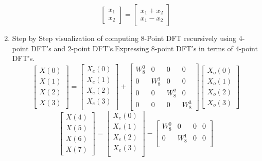 \documentclass[journal,12pt,twocolumn]{IEEEtran}
\renewcommand\thesection{\arabic{section}}
\begin{document}
\begin{enumerate}[label=\thesection.\arabic*.,ref=\thesection.\theenumi]
\begin{equation}
\begin{bmatrix}
x_{1} \\
x_{2}
\end{bmatrix}
=
\begin{bmatrix}
x_{1}+x_{2} \\
x_{1}-x_{2}
\end{bmatrix}
\end{equation}
\item Step by Step visualization of computing 8-Point DFT recursively using 4-point DFT's and 2-point DFT's.Expressing 8-point DFT's in terms of 4-point DFT's.
\begin{equation}
\begin{bmatrix}
X(0) \\ 
X(1) \\ 
X(2) \\ 
X(3)
\end{bmatrix}
=
\begin{bmatrix}
X_{e}(0) \\ 
X_{e}(1)\\ 
X_{e}(2)\\
X_{e}(3)\\
\end{bmatrix}
+
\begin{bmatrix}
W^{0}_{8} & 0 & 0 & 0\\
0 & W^{1}_{8} & 0 & 0\\
0 & 0 & W^{2}_{8} & 0\\
0 & 0 & 0 & W^{3}_{8}
\end{bmatrix}
\begin{bmatrix}
X_{o}(0) \\ 
X_{o}(1) \\ 
X_{o}(2) \\
X_{o}(3)
\end{bmatrix}
\end{equation}
\begin{equation}
\begin{bmatrix}
X(4) \\ 
X(5) \\ 
X(6) \\ 
X(7)
\end{bmatrix}
=
\begin{bmatrix}
X_{e}(0) \\ 
X_{e}(1)\\ 
X_{e}(2)\\
X_{e}(3)\\
\end{bmatrix}
-
\begin{bmatrix}
W^{0}_{8} & 0 & 0 & 0\\
0 & W^{1}_{8} & 0 & 0\\

\end{bmatrix}
\end{equation}
\end{enumerate}
\end{document}
